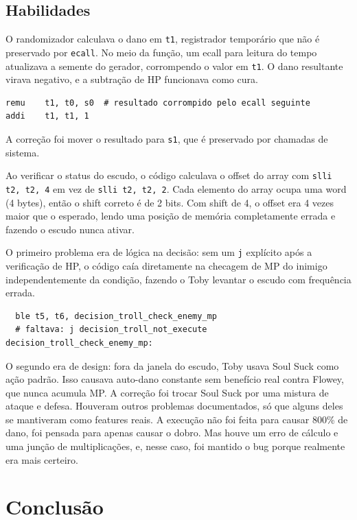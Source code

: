 \documentclass[AMA,twocolumn]{USG}
\begin{document}
\subsection{Habilidades}

O randomizador calculava o dano em \texttt{t1}, registrador temporário que não é preservado por \texttt{ecall}. No meio da função, um ecall para leitura do tempo atualizava a semente do gerador, corrompendo o valor em \texttt{t1}. O dano resultante virava negativo, e a subtração de HP funcionava como cura.

\begin{verbatim}
remu    t1, t0, s0  # resultado corrompido pelo ecall seguinte
addi    t1, t1, 1
\end{verbatim}

A correção foi mover o resultado para \texttt{s1}, que é preservado por chamadas de sistema.

Ao verificar o status do escudo, o código calculava o offset do array com \texttt{slli t2, t2, 4} em vez de \texttt{slli t2, t2, 2}. Cada elemento do array ocupa uma word (4 bytes), então o shift correto é de 2 bits. Com shift de 4, o offset era 4 vezes maior que o esperado, lendo uma posição de memória completamente errada e fazendo o escudo nunca ativar.

O primeiro problema era de lógica na decisão: sem um \texttt{j} explícito após a verificação de HP, o código caía diretamente na checagem de MP do inimigo independentemente da condição, fazendo o Toby levantar o escudo com frequência errada.

\begin{verbatim}
  ble t5, t6, decision_troll_check_enemy_mp
  # faltava: j decision_troll_not_execute
decision_troll_check_enemy_mp:
\end{verbatim}

O segundo era de design: fora da janela do escudo, Toby usava Soul Suck como ação padrão. Isso causava auto-dano constante sem benefício real contra Flowey, que nunca acumula MP. A correção foi trocar Soul Suck por uma mistura de ataque e defesa.
Houveram outros problemas documentados, só que alguns deles se mantiveram como features reais. A execução
não foi feita para causar 800\% de dano, foi pensada para apenas causar o dobro. Mas houve um erro de cálculo e 
uma junção de multiplicações, e, nesse caso, foi mantido o bug porque realmente era mais certeiro.
\section{Conclusão}
\end{document}
